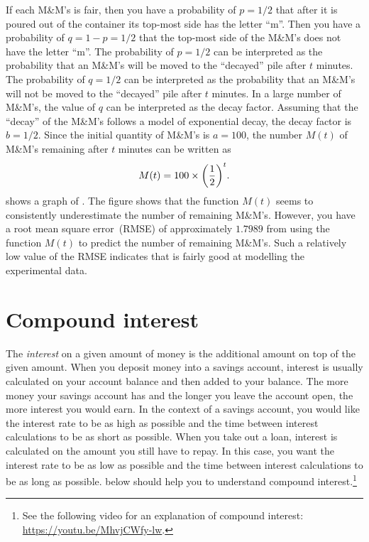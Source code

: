 \documentclass[a4paper,oneside,12pt]{article}
\begin{document}
{\begin{solution}
If each M\&M's is fair, then you have a probability of $p = 1 / 2$
that after it is poured out of the container its top-most side has the
letter ``m''.  Then you have a probability of $q = 1 - p = 1 / 2$ that
the top-most side of the M\&M's does not have the letter ``m''.  The
probability of $p = 1 / 2$ can be interpreted as the probability that
an M\&M's will be moved to the ``decayed'' pile after $t$ minutes.
The probability of $q = 1 / 2$ can be interpreted as the probability
that an M\&M's will not be moved to the ``decayed'' pile after $t$
minutes.  In a large number of M\&M's, the value of $q$ can be
interpreted as the decay factor.  Assuming that the ``decay'' of the
M\&M's follows a model of exponential decay, the decay factor is
$b = 1 / 2$.  Since the initial quantity of M\&M's is $a = 100$, the
number $M(t)$ of M\&M's remaining after $t$ minutes can be written as
\begin{equation}
\label{eqn:MnM_probability_model}
M(t)
=
100
\times
\parenthesis*{
  \frac{1}{2}
}^t.
\end{equation}
 shows a graph of
.  The figure shows that the
function $M(t)$ seems to consistently underestimate the number of
remaining M\&M's.  However, you have a root mean square error~(RMSE)
of approximately $1.7989$ from using the function $M(t)$ to predict
the number of remaining M\&M's.  Such a relatively low value of the
RMSE indicates that  is fairly
good at modelling the experimental data.
\end{solution}
}{}



\section{Compound interest}

The \emph{interest} on a given amount of money is the additional
amount on top of the given amount.  When you deposit money into a
savings account, interest is usually calculated on your account
balance and then added to your balance.  The more money your savings
account has and the longer you leave the account open, the more
interest you would earn.  In the context of a savings account, you
would like the interest rate to be as high as possible and the time
between interest calculations to be as short as possible.  When you
take out a loan, interest is calculated on the amount you still have
to repay.  In this case, you want the interest rate to be as low as
possible and the time between interest calculations to be as long as
possible.   below should help you to
understand compound interest.\footnote{
  See the following video for an explanation of compound interest:
  \url{https://youtu.be/MhvjCWfy-lw}.
}
\end{document}
